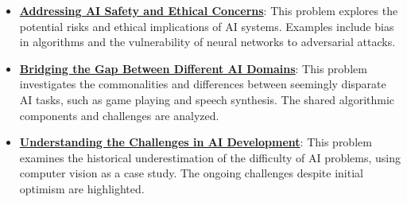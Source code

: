 \documentclass{article}%
\begin{document}
\begin{itemize}[leftmargin=*]
\item \href{\url{https://purdue.brightspace.com/d2l/common/assets/pdfjs-d2l-dist/1.0.14-legacy/web/viewer.html?file=\%252Fcontent\%252Fenforced\%252F1095467-wl.202510.CS.24300.001\%252F02L2-Intro.pdf\%253Fou\%253D1095467\&lang=en-us\&container=d2l-fileviewer-rendered-pdf\&fullscreen=d2l-fileviewer-rendered-pdf-dialog\&height=667}#page=19}{\textbf{Addressing AI Safety and Ethical Concerns}}: This problem explores the potential risks and ethical implications of AI systems. Examples include bias in algorithms and the vulnerability of neural networks to adversarial attacks.%
\item \href{\url{https://purdue.brightspace.com/d2l/common/assets/pdfjs-d2l-dist/1.0.14-legacy/web/viewer.html?file=\%252Fcontent\%252Fenforced\%252F1095467-wl.202510.CS.24300.001\%252F02L2-Intro.pdf\%253Fou\%253D1095467\&lang=en-us\&container=d2l-fileviewer-rendered-pdf\&fullscreen=d2l-fileviewer-rendered-pdf-dialog\&height=667}#page=31}{\textbf{Bridging the Gap Between Different AI Domains}}: This problem investigates the commonalities and differences between seemingly disparate AI tasks, such as game playing and speech synthesis. The shared algorithmic components and challenges are analyzed.%
\item \href{\url{https://purdue.brightspace.com/d2l/common/assets/pdfjs-d2l-dist/1.0.14-legacy/web/viewer.html?file=\%252Fcontent\%252Fenforced\%252F1095467-wl.202510.CS.24300.001\%252F02L2-Intro.pdf\%253Fou\%253D1095467\&lang=en-us\&container=d2l-fileviewer-rendered-pdf\&fullscreen=d2l-fileviewer-rendered-pdf-dialog\&height=667}#page=15}{\textbf{Understanding the Challenges in AI Development}}: This problem examines the historical underestimation of the difficulty of AI problems, using computer vision as a case study. The ongoing challenges despite initial optimism are highlighted.%
\end{itemize}%
\end{document}
